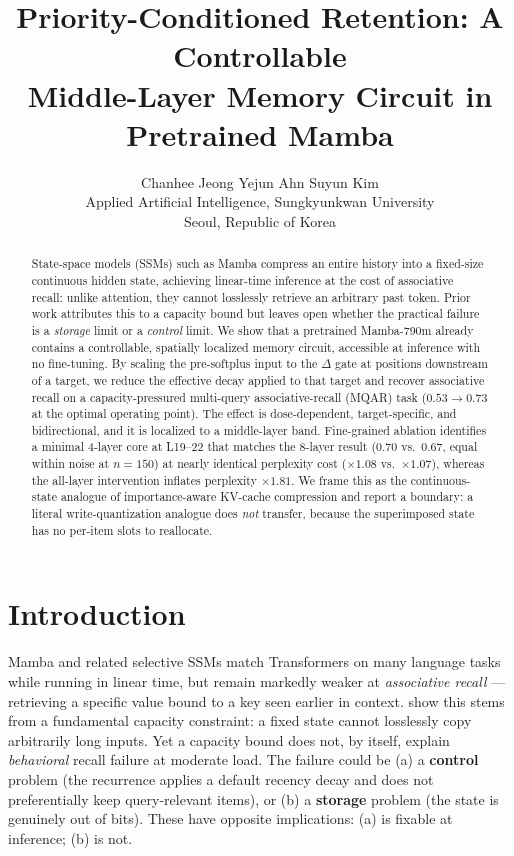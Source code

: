 \documentclass{article}
\title{Priority-Conditioned Retention: A Controllable\\
Middle-Layer Memory Circuit in Pretrained Mamba}
\author{%
  Chanhee Jeong \quad Yejun Ahn \quad Suyun Kim \\[3pt]
  Applied Artificial Intelligence, Sungkyunkwan University \\
  Seoul, Republic of Korea
}
\begin{document}
\maketitle

\begin{abstract}
State-space models (SSMs) such as Mamba compress an entire history into a
fixed-size continuous hidden state, achieving linear-time inference at the cost
of associative recall: unlike attention, they cannot losslessly retrieve an
arbitrary past token. Prior work attributes this to a capacity bound but leaves
open whether the practical failure is a \emph{storage} limit or a \emph{control}
limit. We show that a pretrained Mamba-790m already contains a controllable,
spatially localized memory circuit, accessible at inference with no fine-tuning.
By scaling the pre-softplus input to the $\Delta$ gate at positions downstream of
a target, we reduce the effective decay applied to that target and recover
associative recall on a capacity-pressured multi-query associative-recall (MQAR)
task ($0.53 \to 0.73$ at the optimal operating point). The effect is
dose-dependent, target-specific, and bidirectional, and it is localized to a
middle-layer band. Fine-grained ablation identifies a minimal 4-layer core at
L19--22 that matches the 8-layer result ($0.70$ vs.\ $0.67$, equal within noise
at $n{=}150$) at nearly identical perplexity cost ($\times 1.08$ vs.\ $\times 1.07$), whereas the
all-layer intervention inflates perplexity $\times 1.81$. We frame
this as the continuous-state analogue of importance-aware KV-cache compression
and report a boundary: a literal write-quantization analogue does
\emph{not} transfer, because the superimposed state has no per-item slots to
reallocate.
\end{abstract}

\section{Introduction}
Mamba and related selective SSMs match Transformers on many language tasks while
running in linear time, but remain markedly weaker at \emph{associative recall}
--- retrieving a specific value bound to a key seen earlier in context.
\citet{jelassi2024} show this stems from a fundamental capacity constraint: a
fixed state cannot losslessly copy arbitrarily long inputs. Yet a capacity bound
does not, by itself, explain \emph{behavioral} recall failure at moderate load.
The failure could be (a) a \textbf{control} problem (the recurrence applies a
default recency decay and does not preferentially keep query-relevant items),
or (b) a \textbf{storage} problem (the state is genuinely out of bits). These
have opposite implications: (a) is fixable at inference; (b) is not.
\end{document}
